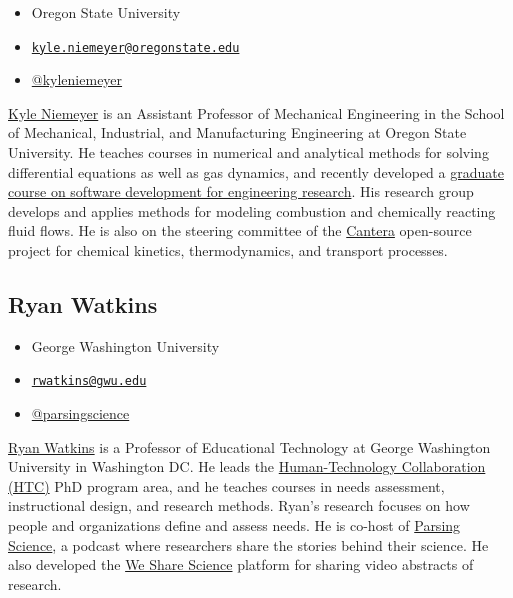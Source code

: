 \documentclass[]{book}
\providecommand{\tightlist}{%
  \setlength{\itemsep}{0pt}\setlength{\parskip}{0pt}}
\begin{document}
\begin{itemize}
\tightlist
\item
  Oregon State University
\item
  \href{mailto:kyle.niemeyer@oregonstate.edu}{\nolinkurl{kyle.niemeyer@oregonstate.edu}}
\item
  \href{https://twitter.com/kyleniemeyer}{@kyleniemeyer}
\end{itemize}

\href{https://niemeyer-research-group.github.io/}{Kyle Niemeyer} is an
Assistant Professor of Mechanical Engineering in the School of
Mechanical, Industrial, and Manufacturing Engineering at Oregon State
University. He teaches courses in numerical and analytical methods for
solving differential equations as well as gas dynamics, and recently
developed a
\href{https://softwaredevengresearch.github.io/syllabus/}{graduate
course on software development for engineering research}. His research
group develops and applies methods for modeling combustion and
chemically reacting fluid flows. He is also on the steering committee of
the \href{https://cantera.org/}{Cantera} open-source project for
chemical kinetics, thermodynamics, and transport processes.

\subsection*{Ryan Watkins}\label{ryan-watkins}

\begin{itemize}
\tightlist
\item
  George Washington University
\item
  \href{mailto:rwatkins@gwu.edu}{\nolinkurl{rwatkins@gwu.edu}}
\item
  \href{https://twitter.com/parsingscience}{@parsingscience}
\end{itemize}

\href{https://gsehd.gwu.edu/directory/ryan-watkins}{Ryan Watkins} is a
Professor of Educational Technology at George Washington University in
Washington DC. He leads the
\href{https://go.gwu.edu/phd}{Human-Technology Collaboration (HTC)} PhD
program area, and he teaches courses in needs assessment, instructional
design, and research methods. Ryan's research focuses on how people and
organizations define and assess needs. He is co-host of
\href{https://parsingscience.org/}{Parsing Science}, a podcast where
researchers share the stories behind their science. He also developed
the \href{https://wesharescience.org/}{We Share Science} platform for
sharing video abstracts of research.
\end{document}
